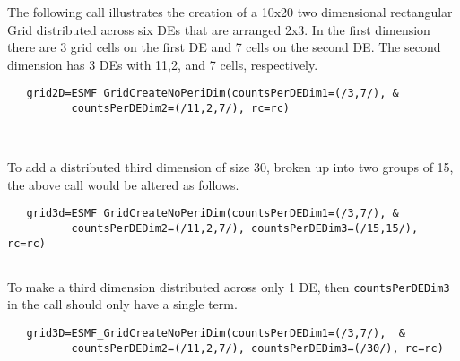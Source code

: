    The following call illustrates the creation of
   a 10x20 two dimensional rectangular Grid distributed across six DEs
   that are arranged 2x3.  In the first dimension there are 3 grid
   cells on the first DE and 7 cells on the second DE.  The second
   dimension has 3 DEs with 11,2, and 7 cells, respectively. 

 \begin{verbatim}
   grid2D=ESMF_GridCreateNoPeriDim(countsPerDEDim1=(/3,7/), &
          countsPerDEDim2=(/11,2,7/), rc=rc)

 
\end{verbatim}
 

   To add a distributed third dimension of size 30, broken up into
   two groups of 15, the above call would be altered as follows. 

 \begin{verbatim}
   grid3d=ESMF_GridCreateNoPeriDim(countsPerDEDim1=(/3,7/), &
          countsPerDEDim2=(/11,2,7/), countsPerDEDim3=(/15,15/), rc=rc)
 
\end{verbatim}
 

   To make a third dimension distributed across only 1 DE, then
   {\tt countsPerDEDim3} in the call should only have a single term. 

 \begin{verbatim}
   grid3D=ESMF_GridCreateNoPeriDim(countsPerDEDim1=(/3,7/),  &
          countsPerDEDim2=(/11,2,7/), countsPerDEDim3=(/30/), rc=rc)
 
\end{verbatim}
 

